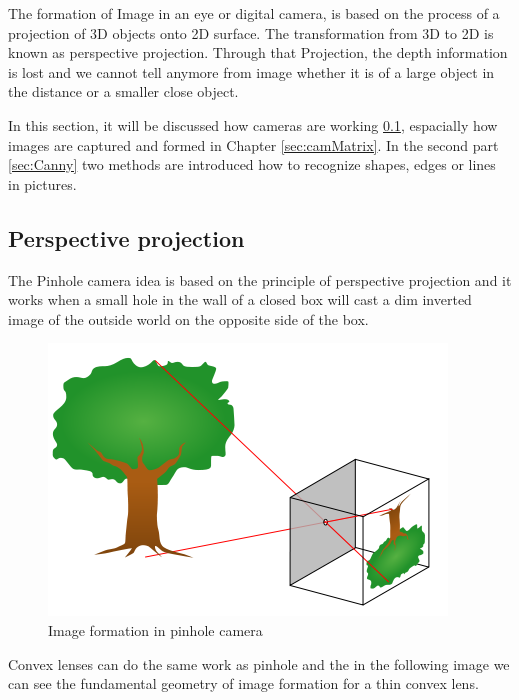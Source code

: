 \documentclass[journal,final,a4paper,twoside]{PS}
\begin{document}
The formation of Image in an eye or digital camera, is based on the process of a projection of 3D objects onto 2D surface. The transformation from 3D to 2D is known as perspective projection. Through that Projection, the depth information is lost and we cannot tell anymore from image whether it is of a large object in the distance or a smaller close object.

In this section, it will be discussed how cameras are working \ref{sec:projection}, espacially how images are captured and formed in Chapter \ref{sec:camMatrix}. In the second part \ref{sec:Canny} two methods are introduced how to recognize shapes, edges or lines in pictures.

\subsection{Perspective projection}
\label{sec:projection}
The Pinhole camera idea is based on the principle of perspective projection and it works when a small hole in the wall of a closed box will cast a dim inverted image of the outside world on the opposite side of the box.
\begin{figure}[h]
\begin{center}
\includegraphics[scale=0.25]{./pics/pinhole.png}
\caption{Image formation in pinhole camera\cite{Wikipedia}}
\label{fig:pinhole}
\end{center}
\end{figure}
Convex lenses can do the same work as pinhole and the in the following image we can see the fundamental geometry of image formation for a thin convex lens.
\end{document}
